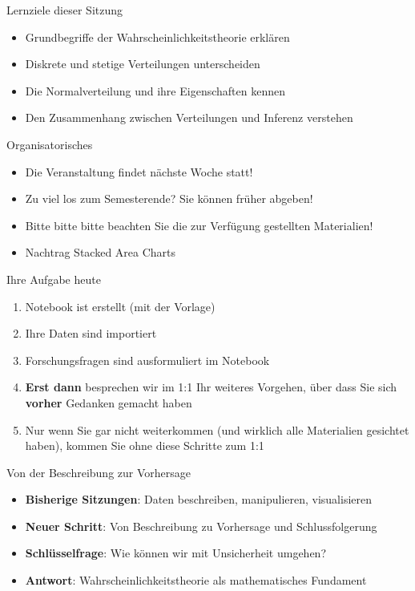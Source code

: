 \documentclass[
  ignorenonframetext,
]{beamer}
\providecommand{\tightlist}{%
  \setlength{\itemsep}{0pt}\setlength{\parskip}{0pt}}
\begin{document}
\begin{frame}{Lernziele dieser Sitzung}
\protect{}\label{lernziele-dieser-sitzung-4}
\begin{itemize}
\tightlist
\item
  Grundbegriffe der Wahrscheinlichkeitstheorie erklären
\item
  Diskrete und stetige Verteilungen unterscheiden
\item
  Die Normalverteilung und ihre Eigenschaften kennen
\item
  Den Zusammenhang zwischen Verteilungen und Inferenz verstehen
\end{itemize}
\end{frame}

\begin{frame}{Organisatorisches}
\protect{}\label{organisatorisches}
\begin{itemize}
\tightlist
\item
  Die Veranstaltung findet nächste Woche statt!
\item
  Zu viel los zum Semesterende? Sie können früher abgeben!
\item
  Bitte bitte bitte beachten Sie die zur Verfügung gestellten
  Materialien!
\item
  Nachtrag Stacked Area Charts
\end{itemize}
\end{frame}

\begin{frame}{Ihre Aufgabe heute}
\protect{}\label{ihre-aufgabe-heute}
\begin{enumerate}
\tightlist
\item
  Notebook ist erstellt (mit der Vorlage)
\item
  Ihre Daten sind importiert
\item
  Forschungsfragen sind ausformuliert im Notebook
\item
  \textbf{Erst dann} besprechen wir im 1:1 Ihr weiteres Vorgehen, über
  dass Sie sich \textbf{vorher} Gedanken gemacht haben
\item
  Nur wenn Sie gar nicht weiterkommen (und wirklich alle Materialien
  gesichtet haben), kommen Sie ohne diese Schritte zum 1:1
\end{enumerate}
\end{frame}

\begin{frame}{Von der Beschreibung zur Vorhersage}
\protect{}\label{von-der-beschreibung-zur-vorhersage}
\begin{itemize}
\tightlist
\item
  \textbf{Bisherige Sitzungen}: Daten beschreiben, manipulieren,
  visualisieren
\item
  \textbf{Neuer Schritt}: Von Beschreibung zu Vorhersage und
  Schlussfolgerung
\item
  \textbf{Schlüsselfrage}: Wie können wir mit Unsicherheit umgehen?
\item
  \textbf{Antwort}: Wahrscheinlichkeitstheorie als mathematisches
  Fundament
\end{itemize}
\end{frame}
\end{document}
